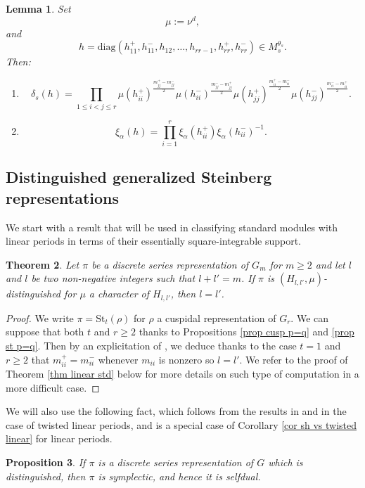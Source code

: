 \documentclass[11pt,letterpaper]{amsart}
\def\St{\mathrm{St}}
\def\diag{\mathrm{diag}}
\theoremstyle{plain}
\newtheorem{thm}{Theorem}[section] \newtheorem{cor}[thm]{Corollary}
\newtheorem{lem}[thm]{Lemma}  \newtheorem{prop}[thm]{Proposition}
\numberwithin{equation}{section}
\begin{document}
\begin{lem}\label{Proposition 3.6 MatCRELLE}
Set \[\mu:=\nu^d,\] and \[h=\diag(h_{11}^+,h_{11}^-,h_{12},\dots,h_{rr-1}, h_{rr}^+,h_{rr}^-)\in M_s^{\theta_s}.\] Then: 
\begin{enumerate}
\item \[\delta_s(h)=\prod_{1\leq i<j \leq r} \mu(h_{ii}^+)^{\frac{m_{jj}^+-m_{jj}^-}{2}}
\mu(h_{ii}^-)^{\frac{m_{jj}^--m_{jj}^+}{2}}\mu(h_{jj}^+)^{\frac{m_{ii}^+-m_{ii}^-}{2}}\mu(h_{jj}^-)^{\frac{m_{ii}^--m_{ii}^+}{2}}.\]
\item \[\xi_{\alpha}(h)=\prod_{i=1}^r \xi_\alpha(h_{ii}^+)\xi_\alpha(h_{ii}^-)^{-1}.\]
\end{enumerate}
\end{lem} 

\subsection{Distinguished generalized Steinberg representations}\label{sec steinberg}

We start with a result that will be used in classifying standard modules with linear periods in terms of their essentially square-integrable support.

\begin{thm}\label{thm p=q}
Let $\pi$ be a discrete series representation of $G_m$ for $m\geq 2$ and let $l$ and $l$ be two non-negative 
integers such that $l+l'=m$. If $\pi$ is $(H_{l,l'},\mu)$-distinguished for $\mu$ a character of $H_{l,l'}$, then $l=l'$.
\end{thm}
\begin{proof}
We write $\pi=\St_t(\rho)$ for $\rho$ a cuspidal representation of $G_r$. We can suppose that both $t$ and $r\geq 2$ thanks to Propositions \ref{prop cusp p=q} and \ref{prop st p=q}. Then by an explicitation of 
\cite[Corollary 5.2]{OJNT}, we deduce thanks to the case $t=1$ and $r\geq 2$ that $m_{ii}^+=m_{ii}^-$ whenever $m_{ii}$ is nonzero so $l=l'$. We refer to the proof of Theorem \ref{thm linear std} below for more details on such type of computation in a more difficult case.
\end{proof}

We will also use the following fact, which follows from the results in \cite{SX} and \cite{X} in the case of twisted linear periods, and is a special case of Corollary \ref{cor sh vs twisted linear} for linear periods.

\begin{prop}\label{prop symp disc}
If $\pi$ is a discrete series representation of $G$ which is distinguished, then $\pi$ is symplectic, and hence it is selfdual.
\end{prop}
\end{document}
